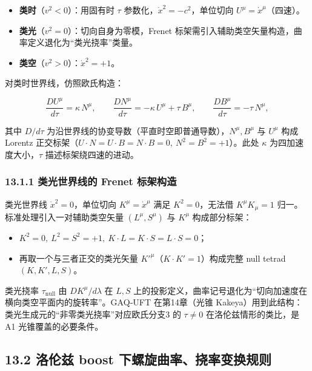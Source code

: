 \begin{itemize}
\tightlist
\item
  \textbf{类时}（\(v^2<0\)）：用固有时 \(\tau\)
  参数化，\(\dot x^2=-c^2\)，单位切向 \(U^\mu=\dot x^\mu\)（四速）。
\item
  \textbf{类光}（\(v^2=0\)）：切向自身为零模，Frenet
  标架需引入辅助类空矢量构造，曲率定义退化为``类光挠率''类量。
\item
  \textbf{类空}（\(v^2>0\)）：\(\dot x^2=+1\)。
\end{itemize}

对类时世界线，仿照欧氏构造：

\[
\frac{D U^\mu}{d\tau}=\kappa\,N^\mu,\qquad
\frac{D N^\mu}{d\tau}=-\kappa\,U^\mu+\tau\,B^\mu,\qquad
\frac{D B^\mu}{d\tau}=-\tau\,N^\mu,
\]

其中 \(D/d\tau\)
为沿世界线的协变导数（平直时空即普通导数），\(N^\mu,B^\mu\) 与 \(U^\mu\)
构成 Lorentz
正交标架（\(U\cdot N=U\cdot B=N\cdot B=0,\ N^2=B^2=+1\)）。此处
\(\kappa\) 为四加速度大小，\(\tau\) 描述标架绕四速的进动。

\subsubsection{13.1.1 类光世界线的 Frenet
标架构造}\label{ux7c7bux5149ux4e16ux754cux7ebfux7684-frenet-ux6807ux67b6ux6784ux9020}

类光世界线 \(\dot x^2=0\)，单位切向 \(K^\mu=\dot x^\mu\) 满足
\(K^2=0\)，无法借 \(K^\mu K_\mu=1\) 归一。标准处理引入一对辅助类空矢量
\((L^\mu,S^\mu)\) 与 \(K^\mu\) 构成部分标架：

\begin{itemize}
\tightlist
\item
  \(K^2=0,\ L^2=S^2=+1,\ K\cdot L=K\cdot S=L\cdot S=0\)；
\item
  再取一个与三者正交的类光矢量 \(K'^\mu\)（\(K\cdot K'=1\)）构成完整
  null tetrad \((K,K',L,S)\)。
\end{itemize}

类光挠率 \(\tau_{\mathrm{null}}\) 由 \(DK^\mu/d\lambda\) 在 \(L,S\)
上的投影定义，曲率记号退化为``切向加速度在横向类空平面内的旋转率''。GAQ‑UFT
在第14章（光锥
Kakeya）用到此结构：类光生成元的``非零类光挠率''对应欧氏分支3 的
\(\tau\neq0\) 在洛伦兹情形的类比，是 A1 光锥覆盖的必要条件。

\subsection{13.2 洛伦兹 boost
下螺旋曲率、挠率变换规则}\label{ux6d1bux4f26ux5179-boost-ux4e0bux87baux65cbux66f2ux7387ux6320ux7387ux53d8ux6362ux89c4ux5219}

